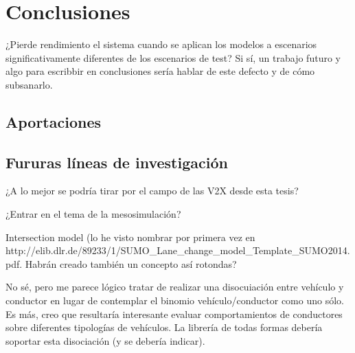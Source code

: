 \chapter{Conclusiones}
\label{ch:conclusions}

¿Pierde rendimiento el sistema cuando se aplican los modelos a escenarios significativamente diferentes de los escenarios de test? Si sí, un trabajo futuro y algo para escribbir en conclusiones sería hablar de este defecto y de cómo subsanarlo.

\section{Aportaciones}
\label{ch:conclusions:contributions}

\section{Fururas líneas de investigación}
\label{ch:conclusions:future-work}

¿A lo mejor se podría tirar por el campo de las V2X desde esta tesis?

¿Entrar en el tema de la mesosimulación?

Intersection model (lo he visto nombrar por primera vez en http://elib.dlr.de/89233/1/SUMO\_Lane\_change\_model\_Template\_SUMO2014.pdf. Habrán creado también un concepto así rotondas?

No sé, pero me parece lógico tratar de realizar una disocuiación entre vehículo y conductor en lugar de contemplar el binomio vehículo/conductor como uno sólo. Es más, creo que resultaría interesante evaluar comportamientos de conductores sobre diferentes tipologías de vehículos. La librería de todas formas debería soportar esta disociación (y se debería indicar).